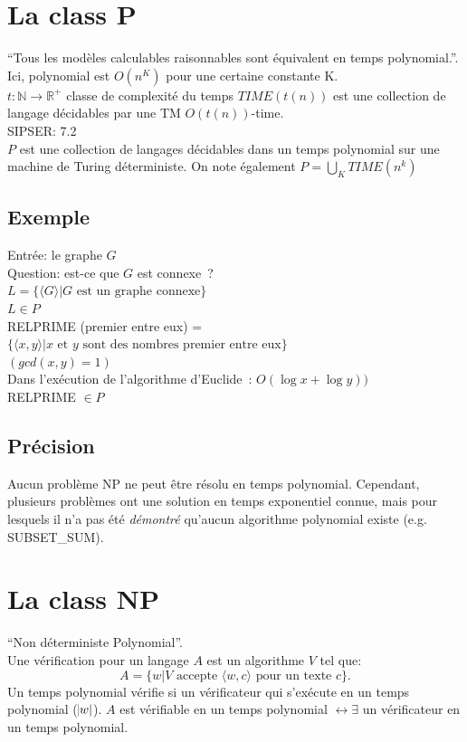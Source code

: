 \documentclass[a4paper,12pt]{article}
\begin{document}
\section{La class P}
  ``Tous les modèles calculables raisonnables sont équivalent en temps polynomial.''.  Ici, polynomial est $O(n^K)$ pour une certaine constante K.\\
  $t: \mathbb{N} \rightarrow \mathbb{R}^+$ classe de complexité du temps $TIME(t(n))$ est une collection de langage décidables par une TM $O(t(n))$-time.\\
  SIPSER: 7.2\\

  $P$ est une collection de langages décidables dans un temps polynomial sur une machine de Turing déterministe. On note également $P = \bigcup_K TIME(n^k)$

  \subsection{Exemple}
    Entrée: le graphe $G$\\
    Question: est-ce que $G$ est connexe~?\\
    $L = \{\langle G\rangle | G \text{ est un graphe connexe}\}$\\
    $L \in P$\\

  RELPRIME (premier entre eux) = $\{\langle x, y\rangle | x \text{ et } y \text{ sont des nombres premier entre eux}\}$\\
  $(gcd(x, y) = 1)$\\
  Dans l'exécution de l'algorithme d'Euclide~: $O(\log x + \log y))$\\
  RELPRIME $\in P$\\
  
  \subsection{Précision}
    Aucun problème NP ne peut être résolu en temps polynomial. Cependant, plusieurs problèmes ont une solution en temps exponentiel connue, mais pour lesquels il n'a pas été \textit{démontré} qu'aucun algorithme polynomial existe (e.g. SUBSET\_SUM).

\section{La class NP}
  ``Non déterministe Polynomial''.\\
  Une vérification pour un langage $A$ est un algorithme $V$ tel que:
	\[A = \{w | V \text{ accepte } \langle w, c\rangle \text{ pour un texte } c\}.\]
  Un temps polynomial vérifie si un vérificateur qui s'exécute en un temps polynomial ($\abs w$).
	$A$ est vérifiable en un temps polynomial $\leftrightarrow \exists $ un vérificateur en un temps polynomial.
\end{document}
